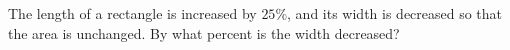 The length of a rectangle is increased by $25\%$, and its width is decreased so that the area is unchanged. By what percent is the width decreased?
